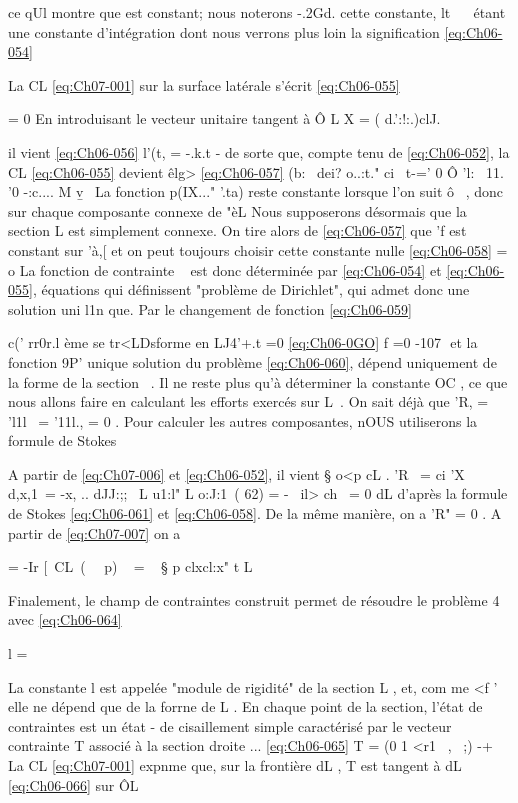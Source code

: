ce qUl montre que est constant; nous noterons -.2Gd. cette constante,
lt~ 
~ étant une constante d'intégration dont nous verrons plus loin la signifi­cation 
\eqref{eq:Ch06-054} 

La CL \eqref{eq:Ch07-001} sur la surface latérale s'écrit 
\eqref{eq:Ch06-055} 

= 0 
En introduisant le vecteur unitaire 
tangent à Ô L 
X = ( d.':!:.)clJ. 

il vient 
\eqref{eq:Ch06-056} 
l'(t, = -.k.t -­
de sorte que, compte tenu de \eqref{eq:Ch06-052}, la CL \eqref{eq:Ch06-055} devient 
êlg>
\eqref{eq:Ch06-057} (b:~ dei? o..:t." ci~ 
t-=' 0 Ô 'l:~ 11. '0 -:c.... M v\b ~ 
La fonction p(IX..." '.ta) reste constante lorsque l'on suit ô~ , donc sur cha­que composante connexe de "èL Nous supposerons désormais que la section L 
est simplement connexe. On tire alors de \eqref{eq:Ch06-057} que 'f est constant sur 'à,[ et 
on peut toujours choisir cette constante nulle 
\eqref{eq:Ch06-058} = o 
La fonction de contrainte ~ est donc déterminée par \eqref{eq:Ch06-054} et \eqref{eq:Ch06-055}, équations 
qui définissent "problème de Dirichlet", qui admet donc une solution uni­
l1n 
que. Par le changement de fonction 
\eqref{eq:Ch06-059} 

c(' rr0r.l ème se tr<LDsforme en 
LJ4'+.t =0 
\eqref{eq:Ch06-0GO} f 
=0 
-107 ­
et la fonction 9P' unique solution du problème \eqref{eq:Ch06-060}, dépend uniquement de la forme de la section ~. 
Il ne reste plus qu'à déterminer la constante OC , ce que nous al­lons faire en calculant les efforts exercés sur L~. On sait déjà que 'R, = 'l1l~ = '11l., = 0 . Pour calculer les autres composantes, nOUS utiliserons la formule de Stokes 

A partir de \eqref{eq:Ch07-006} et \eqref{eq:Ch06-052}, il vient 
§ o<p cL .
'R~ = ci 'X~ d,x,1\ = -x, .. dJJ:;;
~L u1:l" 
L o:J:1\
( 62) = -~ il> ch~ = 0 
dL 
d'après la formule de Stokes \eqref{eq:Ch06-061} et \eqref{eq:Ch06-058}. De la même manière, on a 'R" = 0 . A partir de \eqref{eq:Ch07-007} on a 

= -Ir [~CL~(~~ p) ~ 
= ~ § p clxcl:x"
t
L 


Finalement, le champ de contraintes construit permet de résoudre le problème 4 avec 
\eqref{eq:Ch06-064} 

l = 

La constante l est appelée "module de rigidité" de la section L , et, com­
me <f ' elle ne dépend que de la forrne de L . 
En chaque point de la section, l'état de contraintes est un état
-
de cisaillement simple caractérisé par le vecteur contrainte T associé à la section droite 
... 
\eqref{eq:Ch06-065} 
T = (0 1 <r1~ , ~;) 
-+ 
La CL \eqref{eq:Ch07-001} expnme que, sur la frontière dL , T est tangent à dL 
\eqref{eq:Ch06-066} sur ÔL 

